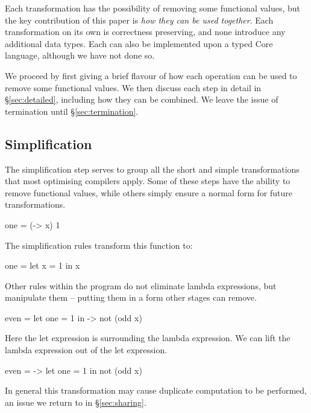 \documentclass[preprint]{sigplanconf}
\begin{document}
Each transformation has the possibility of removing some functional values, but the key contribution of this paper is \textit{how they can be used together}. Each transformation on its own is correctness preserving, and none introduce any additional data types. Each can also be implemented upon a typed Core language, although we have not done so.

We proceed by first giving a brief flavour of how each operation can be used to remove some functional values. We then discuss each step in detail in \S\ref{sec:detailed}, including how they can be combined. We leave the issue of termination until \S\ref{sec:termination}.

\subsection{Simplification}

The simplification step serves to group all the short and simple transformations that most optimising compilers apply. Some of these steps have the ability to remove functional values, while others simply ensure a normal form for future transformations.

\begin{example}
\begin{code}
one = (\x -> x) 1
\end{code}

The simplification rules transform this function to:

\begin{code}
one = let x = 1 in x
\end{code}
\end{example}

Other rules within the program do not eliminate lambda expressions, but manipulate them -- putting them in a form other stages can remove.

\begin{example}
\begin{code}
even =  let one = 1
        in \x -> not (odd x)
\end{code}

Here the let expression is surrounding the lambda expression. We can lift the lambda expression out of the let expression.

\begin{code}
even = \x ->  let one = 1
              in not (odd x)
\end{code}

In general this transformation may cause duplicate computation to be performed, an issue we return to in \S\ref{sec:sharing}.
\end{example}
\end{document}
